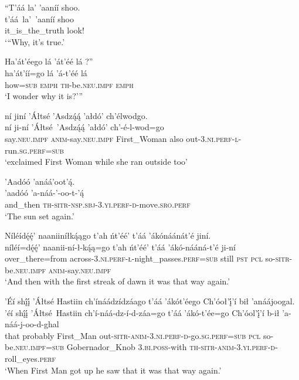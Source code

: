 \ea\label{ex:text5-2-5}
``T’áá la’ ’aaníí shoo.\\
\gll t’áá~la’~{’aaníí}	shoo\\
     it\_is\_the\_truth	look!\\
\glt `“Why, it's true.'
\z

\ea\label{ex:text5-2-6}
Ha’át’éego lá ’át’éé lá ?''\\
\gll ha’át’íí=go	lá	’á-t’éé	lá\\
     how=\textsc{sub}	\textsc{emph}	\textsc{th}-be.\textsc{neu}.\textsc{impf}	\textsc{emph}\\
\glt `I wonder why it is?'''
\z

\ea\label{ex:text5-2-7}
ní jiní ’Áłtsé ’Asdzą́ą́ ’ałdó’ ch’élwodgo.\\
\gll ní	ji-ní	’Áłtsé~{’Asdzą́ą́}	’ałdó’	ch’-é-l-wod=go\\
     say.\textsc{neu}.\textsc{impf}	\textsc{anim}-say.\textsc{neu}.\textsc{impf}	First\_Woman	also	out-3.\textsc{ni}.\textsc{perf}-\textsc{l}-run.\textsc{sg}.\textsc{perf}=\textsc{sub}\\
\glt `exclaimed First Woman while she ran outside too'
\z

\ea\label{ex:text5-3-1}
’Aadóó ’anáá’oot’ą́.\\
\gll ’aadóó	’a-náá-’-oo-t-’ą́\\
     and\_then	\textsc{th}-\textsc{sitr}-\textsc{nsp}.\textsc{sbj}-3.\textsc{yi}.\textsc{perf}-\textsc{d}-move.\textsc{sro}.\textsc{perf}\\
\glt `The sun set again.'
\z

\newpage
\ea\label{ex:text5-3-2}
Níléídę́ę́’ naaniiníłką́ągo t’ah ńt’éé’ t’áá ’ákónáánát’é jiní.\\
\gll níléí=dę́ę́’	naanii-ní-ł-ką́ą=go	t’ah	ńt’éé’	t’áá	’ákó-nááná-t’é	ji-ní\\
     over\_there=from	across-3.\textsc{ni}.\textsc{perf}-\textsc{ł}-night\_passes.\textsc{perf}=\textsc{sub}	still	\textsc{pst}	\textsc{pcl}	so-\textsc{sitr}-be.\textsc{neu}.\textsc{impf}	\textsc{anim}-say.\textsc{neu}.\textsc{impf}\\
\glt `And then with the first streak of dawn it was that way again.'
\z

\ea\label{ex:text5-3-3}
’Éí shį́į́ ’Áłtsé Hastiin ch’ínáádzídzáago t’áá ’ákót’éego Ch’óoł’į́’í bił ’anáájoogal.\\
\gll ’éí	shį́į́	’Áłtsé~{Hastiin}	ch’í-náá-dz-í-d-záa=go	t’áá	’ákó-t’ée=go	Ch’óol’į́’í	b-ił	’a-náá-j-oo-d-ghal\\
     that	probably	First\_Man	out-\textsc{sitr}-\textsc{anim}-3.\textsc{ni}.\textsc{perf}-\textsc{d}-go.\textsc{sg}.\textsc{perf}=\textsc{sub}	\textsc{pcl}	so-be.\textsc{neu}.\textsc{impf}=\textsc{sub}	Gobernador\_Knob	3.\textsc{bi}.\textsc{poss}-with	\textsc{th}-\textsc{sitr}-\textsc{anim}-3.\textsc{yi}.\textsc{perf}-\textsc{d}-roll\_eyes.\textsc{perf}\\
\glt `When First Man got up he saw that it was that way again.'
\z

